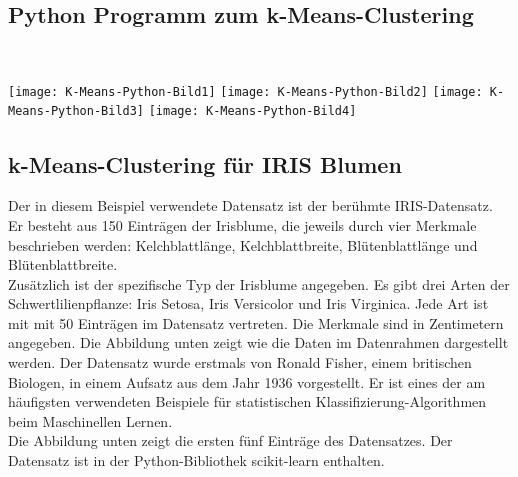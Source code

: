 \documentclass[12pt]{article}
\begin{document}
\subsection{Python Programm zum k-Means-Clustering}

{\color{red}{***********************************************************************\\ 
Ab hier bis Ende der Section sind die Folien der Vorlesung ML  zu nutzen und diese sind in Latex umzusetzen...\\
************************************************************************}}\\[0.2cm]


\begin{center}
\hspace*{-2.0cm}   
\texttt{[image: K-Means-Python-Bild1]}
\hspace*{-2.0cm}   
\texttt{[image: K-Means-Python-Bild2]}
\hspace*{-2.0cm} 
\texttt{[image: K-Means-Python-Bild3]}
\hspace*{-2.0cm} 
\texttt{[image: K-Means-Python-Bild4]}
\end{center}

\subsection{k-Means-Clustering für IRIS Blumen}


Der in diesem Beispiel verwendete Datensatz ist der berühmte IRIS-Datensatz. Er besteht aus 150 Einträgen der Irisblume, die jeweils durch vier Merkmale beschrieben werden: Kelchblattlänge, Kelchblattbreite, Blütenblattlänge und
Blütenblattbreite. \\
Zusätzlich ist der spezifische Typ der Irisblume angegeben. Es gibt drei Arten
der Schwertlilienpflanze: Iris Setosa, Iris Versicolor und Iris Virginica. Jede Art ist mit mit 50 Einträgen im Datensatz vertreten. Die Merkmale sind in Zentimetern angegeben. Die Abbildung unten zeigt wie die Daten im Datenrahmen dargestellt werden. Der Datensatz wurde erstmals von Ronald Fisher, einem britischen Biologen, in einem Aufsatz aus dem Jahr 1936 vorgestellt. Er ist eines der am häufigsten verwendeten Beispiele für statistischen Klassifizierung-Algorithmen beim Maschinellen Lernen. \\
Die Abbildung unten zeigt die ersten fünf Einträge des Datensatzes. Der Datensatz ist in der Python-Bibliothek scikit-learn enthalten.\\ 
\end{document}
